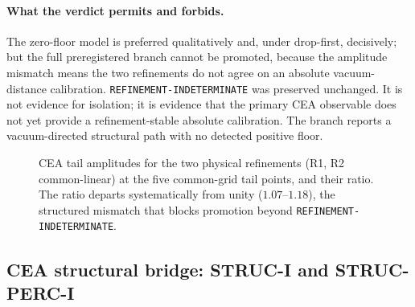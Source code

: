 \documentclass[11pt,a4paper]{article}
\theoremstyle{definition}
\theoremstyle{remark}
\begin{document}
\paragraph{What the verdict permits and forbids.} The zero-floor model is preferred qualitatively and, under drop-first, decisively; but the full preregistered branch cannot be promoted, because the amplitude mismatch means the two refinements do not agree on an absolute vacuum-distance calibration. \texttt{REFINEMENT-\allowbreak{}INDETERMINATE} was preserved unchanged. It is not evidence for isolation; it is evidence that the primary CEA observable does not yet provide a refinement-stable absolute calibration. The branch reports a vacuum-directed structural path with no detected positive floor.

\begin{figure}[t]
\centering
{}
\caption{CEA tail amplitudes for the two physical refinements (R1, R2 common-linear) at the five common-grid tail points, and their ratio. The ratio departs systematically from unity ($1.07$--$1.18$), the structured mismatch that blocks promotion beyond \texttt{REFINEMENT-\allowbreak{}INDETERMINATE}.}\label{fig:cea}
\end{figure}

\subsection{CEA structural bridge: STRUC-I and STRUC-PERC-I}\label{ssec:ceastruc}
\end{document}
